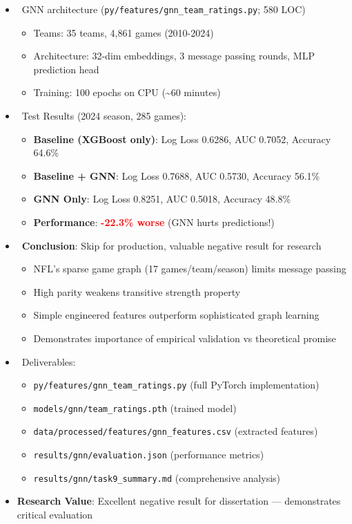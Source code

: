 \begin{itemize}
  \item \done\ GNN architecture (\texttt{py/features/gnn\_team\_ratings.py}; 580 LOC)
  \begin{itemize}
    \item Teams: 35 teams, 4,861 games (2010-2024)
    \item Architecture: 32-dim embeddings, 3 message passing rounds, MLP prediction head
    \item Training: 100 epochs on CPU (\textasciitilde 60 minutes)
  \end{itemize}
  \item \done\ Test Results (2024 season, 285 games):
  \begin{itemize}
    \item \textbf{Baseline (XGBoost only)}: Log Loss 0.6286, AUC 0.7052, Accuracy 64.6\%
    \item \textbf{Baseline + GNN}: Log Loss 0.7688, AUC 0.5730, Accuracy 56.1\%
    \item \textbf{GNN Only}: Log Loss 0.8251, AUC 0.5018, Accuracy 48.8\%
    \item \textbf{Performance}: \textcolor{red}{\textbf{-22.3\% worse}} (GNN hurts predictions!)
  \end{itemize}
  \item \done\ \textbf{Conclusion}: Skip for production, valuable negative result for research
  \begin{itemize}
    \item NFL's sparse game graph (17 games/team/season) limits message passing
    \item High parity weakens transitive strength property
    \item Simple engineered features outperform sophisticated graph learning
    \item Demonstrates importance of empirical validation vs theoretical promise
  \end{itemize}
  \item \done\ Deliverables:
  \begin{itemize}
    \item \texttt{py/features/gnn\_team\_ratings.py} (full PyTorch implementation)
    \item \texttt{models/gnn/team\_ratings.pth} (trained model)
    \item \texttt{data/processed/features/gnn\_features.csv} (extracted features)
    \item \texttt{results/gnn/evaluation.json} (performance metrics)
    \item \texttt{results/gnn/task9\_summary.md} (comprehensive analysis)
  \end{itemize}
  \item \textbf{Research Value}: Excellent negative result for dissertation — demonstrates critical evaluation
\end{itemize}

